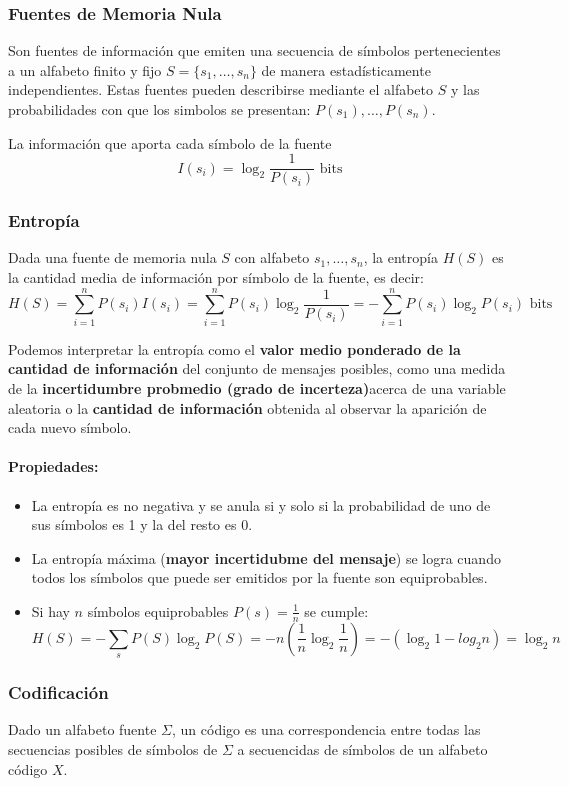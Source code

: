\documentclass[10pt,a4paper]{article}
\begin{document}
\subsubsection{Fuentes de Memoria Nula}
Son fuentes de información que emiten una secuencia de símbolos pertenecientes a un alfabeto finito y fijo \(S=\{s_1,\dots,s_n\}\) de manera estadísticamente independientes. Estas fuentes pueden describirse mediante el alfabeto \(S\) y las probabilidades con que los simbolos se presentan: \(P(s_1), \dots, P(s_n)\).

La información que aporta cada símbolo de la fuente \[I(s_i) = \log_2\frac{1}{P(s_i)}\text{ bits}\]
\subsubsection{Entropía}
Dada una fuente de memoria nula \(S\) con alfabeto \({s_1,\dots,s_n}\), la entropía \(H(S)\) es la cantidad media de información por símbolo de la fuente, es decir:
\[H(S) = \sum_{i=1}^n P(s_i)I(s_i) = \sum_{i=1}^n P(s_i)\log_2\frac{1}{P(s_i)} = -\sum_{i=1}^n P(s_i)\log_2 P(s_i)\text{ bits} \]

Podemos interpretar la entropía como el \textbf{valor medio ponderado de la cantidad de información} del conjunto de mensajes posibles, como una medida de la \textbf{incertidumbre probmedio (grado de incerteza)}acerca de una variable aleatoria o la \textbf{cantidad de información} obtenida al observar la aparición de cada nuevo símbolo.

\paragraph{Propiedades:}
\begin{itemize}
  \item La entropía es no negativa y se anula si y solo si la probabilidad de uno de sus símbolos es 1 y la del resto es 0.
  \item La entropía máxima (\textbf{mayor incertidubme del mensaje}) se logra cuando todos los símbolos que puede ser emitidos por la fuente son equiprobables.
  \item Si hay \(n\) símbolos equiprobables \(P(s)=\frac{1}{n}\) se cumple:
    \[
      H(S) = -\sum_s P(S)\log_2 P(S) = -n(\frac{1}{n}\log_2\frac{1}{n}) = -(\log_2 1 - log_2 n) = \log_2 n
    \]
\end{itemize}

\subsubsection{Codificación}
Dado un alfabeto fuente \(\Sigma\), un código es una correspondencia entre todas las secuencias posibles de símbolos de \(\Sigma\) a secuencidas de símbolos de un alfabeto código \(X\).
\end{document}
